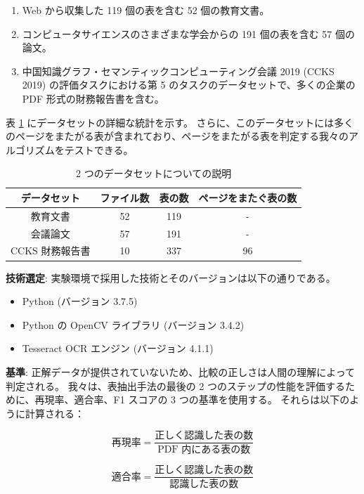 \documentclass[uplatex, twocolumn,10pt]{jsarticle}
\begin{document}
\begin{enumerate}
    \item Web から収集した 119 個の表を含む 52 個の教育文書。
    \item コンピュータサイエンスのさまざまな学会からの 191 個の表を含む 57 個の論文。
    \item 中国知識グラフ・セマンティックコンピューティング会議 2019 (CCKS 2019) の評価タスクにおける第 5 のタスクのデータセットで、多くの企業の PDF 形式の財務報告書を含む。
\end{enumerate}

表 \ref{table1} にデータセットの詳細な統計を示す。
さらに、このデータセットには多くのページをまたがる表が含まれており、ページをまたがる表を判定する我々のアルゴリズムをテストできる。

\begin{table}[tp]
    \centering
    \caption{2 つのデータセットについての説明}
    \label{table1}
    \begin{tabular}{cccc}
        データセット & ファイル数 & 表の数 & ページをまたぐ表の数 \\
        \toprule
        教育文書 & 52 & 119 & - \\
        会議論文 & 57 & 191 & - \\
        CCKS 財務報告書 & 10 & 337 & 96 \\
    \end{tabular}
\end{table}

\textbf{技術選定}:
実験環境で採用した技術とそのバージョンは以下の通りである。
\begin{itemize}
    \item Python (バージョン 3.7.5)
    \item Python の OpenCV ライブラリ (バージョン 3.4.2)
    \item Tesseract OCR エンジン (バージョン 4.1.1)
\end{itemize}

\textbf{基準}:
正解データが提供されていないため、比較の正しさは人間の理解によって判定される。
我々は、表抽出手法の最後の 2 つのステップの性能を評価するために、再現率、適合率、F1 スコアの 3 つの基準を使用する。
それらは以下のように計算される：

\begin{equation}
    \text{再現率} = \frac{\text{正しく認識した表の数}}{\text{PDF 内にある表の数}}
\end{equation}

\begin{equation}
    \text{適合率} = \frac{\text{正しく認識した表の数}}{\text{認識した表の数}}
\end{equation}
\end{document}
